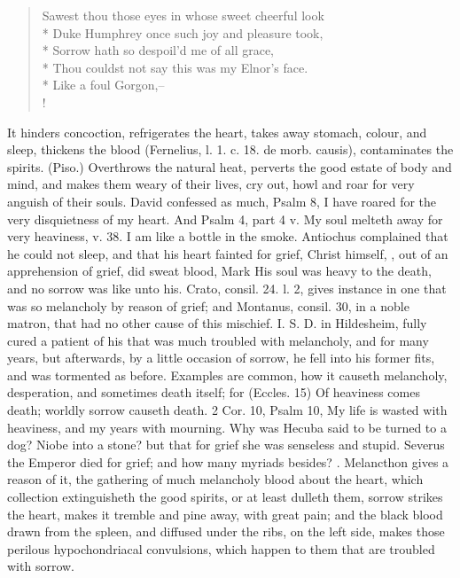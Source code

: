 {{\begin{verse}
Sawest thou those eyes in whose sweet cheerful look\\*
Duke Humphrey once such joy and pleasure took,\\*
Sorrow hath so despoil'd me of all grace,\\*
Thou couldst not say this was my Elnor's face.\\*
Like a foul Gorgon,--\\!
\end{verse}

It hinders concoction, refrigerates the heart, takes away
stomach, colour, and sleep, thickens the blood (Fernelius, l. 1.
c. 18. \textlatin{de morb. causis}), contaminates the spirits. (Piso.)
Overthrows the natural heat, perverts the good estate of body and mind,
and makes them weary of their lives, cry out, howl and roar for very
anguish of their souls. David confessed as much, Psalm  8, I
have roared for the very disquietness of my heart. And Psalm  4,
part 4 v. My soul melteth away for very heaviness, v. 38. I am like a
bottle in the smoke. Antiochus complained that he could not sleep, and
that his heart fainted for grief, Christ himself, ,
out of an apprehension of grief, did sweat blood, Mark  His soul
was heavy to the death, and no sorrow was like unto his. Crato, consil.
24. l. 2, gives instance in one that was so melancholy by reason of
grief; and Montanus, consil. 30, in a noble matron, that
had no other cause of this mischief. I. S. D. in Hildesheim, fully
cured a patient of his that was much troubled with melancholy, and for
many years, but afterwards, by a little occasion of sorrow, he
fell into his former fits, and was tormented as before. Examples are
common, how it causeth melancholy, desperation, and sometimes
death itself; for (Eccles.  15) Of heaviness comes death;
worldly sorrow causeth death. 2 Cor.  10, Psalm  10, My life
is wasted with heaviness, and my years with mourning. Why was Hecuba
said to be turned to a dog? Niobe into a stone? but that for grief she
was senseless and stupid. Severus the Emperor  died for grief;
and how many myriads besides? . Melancthon gives a reason of it, the
gathering of much melancholy blood about the heart, which collection
extinguisheth the good spirits, or at least dulleth them, sorrow
strikes the heart, makes it tremble and pine away, with great pain; and
the black blood drawn from the spleen, and diffused under the ribs, on
the left side, makes those perilous hypochondriacal convulsions, which
happen to them that are troubled with sorrow.

}}
